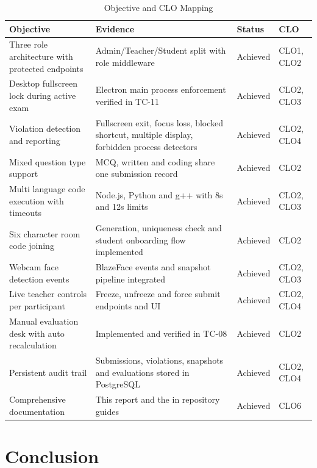 \documentclass[12pt, a4paper]{report}
\begin{document}
\begin{table}[H]
  \caption{Objective and CLO Mapping}
  \label{tab:4.5}
  \centering
  {\fontsize{10}{13}\selectfont
    \begin{tabular}{|p{2in}|p{2in}|p{0.7in}|p{0.6in}|}
      \hline
      \textbf{Objective} & \textbf{Evidence} & \textbf{Status} & \textbf{CLO} \\
      \hline
      Three role architecture with protected endpoints & Admin/Teacher/Student split with role middleware & Achieved & CLO1, CLO2 \\
      \hline
      Desktop fullscreen lock during active exam & Electron main process enforcement verified in TC-11 & Achieved & CLO2, CLO3 \\
      \hline
      Violation detection and reporting & Fullscreen exit, focus loss, blocked shortcut, multiple display, forbidden process detectors & Achieved & CLO2, CLO4 \\
      \hline
      Mixed question type support & MCQ, written and coding share one submission record & Achieved & CLO2 \\
      \hline
      Multi language code execution with timeouts & Node.js, Python and g++ with 8s and 12s limits & Achieved & CLO2, CLO3 \\
      \hline
      Six character room code joining & Generation, uniqueness check and student onboarding flow implemented & Achieved & CLO2 \\
      \hline
      Webcam face detection events & BlazeFace events and snapshot pipeline integrated & Achieved & CLO2, CLO3 \\
      \hline
      Live teacher controls per participant & Freeze, unfreeze and force submit endpoints and UI & Achieved & CLO2, CLO4 \\
      \hline
      Manual evaluation desk with auto recalculation & Implemented and verified in TC-08 & Achieved & CLO2 \\
      \hline
      Persistent audit trail & Submissions, violations, snapshots and evaluations stored in PostgreSQL & Achieved & CLO2, CLO4 \\
      \hline
      Comprehensive documentation & This report and the in repository guides & Achieved & CLO6 \\
      \hline
    \end{tabular}
  }
\end{table}

\section{Conclusion}
\end{document}
